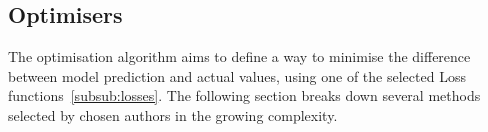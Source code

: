  
%

%
\subsection{Optimisers} \label{subsec:optimisers}
The optimisation algorithm aims to define a way to minimise the difference between model prediction and actual values, using one of the selected Loss functions~\ref{subsub:losses}.
The following section breaks down several methods selected by chosen authors in the growing complexity.

